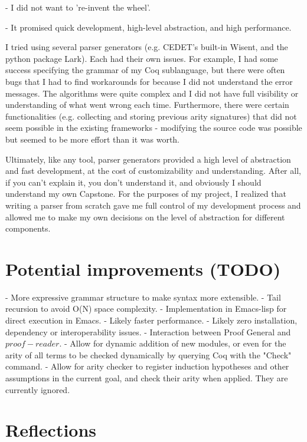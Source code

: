 - I did not want to 're-invent the wheel'.

- It promised quick development, high-level abstraction, and high performance.

I tried using several parser generators (e.g. CEDET's built-in Wisent, and the python package Lark). Each had their own issues. For example, I had some success specifying the grammar of my Coq sublanguage, but there were often bugs that I had to find workarounds for because I did not understand the error messages. The algorithms were quite complex and I did not have full visibility or understanding of what went wrong each time. Furthermore, there were certain functionalities (e.g. collecting and storing previous arity signatures) that did not seem possible in the existing frameworks - modifying the source code was possible but seemed to be more effort than it was worth.

Ultimately, like any tool, parser generators provided a high level of abstraction and fast development, at the cost of customizability and understanding. After all, if you can't explain it, you don't understand it, and obviously I should understand my own Capstone.  For the purposes of my project, I realized that writing a parser from scratch gave me full control of my development process and allowed me to make my own decisions on the level of abstraction for different components.

\section{Potential improvements (TODO)}
- More expressive grammar structure to make syntax more extensible.
- Tail recursion to avoid O(N) space complexity.
- Implementation in Emacs-lisp for direct execution in Emacs.
- Likely faster performance.
- Likely zero installation, dependency or interoperability issues.
- Interaction between Proof General and $proof-reader$.
- Allow for dynamic addition of new modules, or even for the arity of all terms to be checked dynamically by querying Coq with the "Check" command.
- Allow for arity checker to register induction hypotheses and other assumptions in the current goal, and check their arity when applied. They are currently ignored.

\section{Reflections}